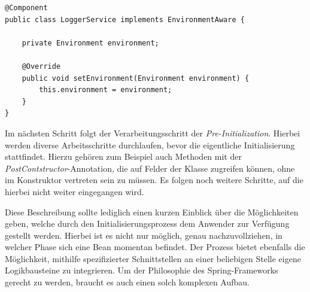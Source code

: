 \begin{lstlisting}[style=javaStyle,caption={Bean - EnvironmentAware \cite{bean-aware}},label=lst:bean-aware]
@Component
public class LoggerService implements EnvironmentAware {

	private Environment environment;

	@Override
	public void setEnvironment(Environment environment) {
		this.environment = environment;
	}
}
\end{lstlisting}
Im nächsten Schritt folgt der Verarbeitungsschritt der \emph{Pre-Initialization}. Hierbei werden diverse Arbeitsschritte durchlaufen, bevor die eigentliche Initialisierung stattfindet. Hierzu gehören zum Beispiel auch Methoden mit der \emph{PostContstructor}-Annotation, die auf Felder der Klasse zugreifen können, ohne im Konstruktor vertreten sein zu müssen. Es folgen noch weitere Schritte, auf die hierbei nicht weiter eingegangen wird. 

Diese Beschreibung sollte lediglich einen kurzen Einblick über die Möglichkeiten geben, welche durch den Initialisierungsprozess dem Anwender zur Verfügung gestellt werden. Hierbei ist es nicht nur möglich, genau nachzuvollziehen, in welcher Phase sich eine Bean momentan befindet. Der Prozess bietet ebenfalls die Möglichkeit, mithilfe spezifizierter Schnittstellen an einer beliebigen Stelle eigene Logikbausteine zu integrieren. Um der Philosophie des Spring-Frameworks gerecht zu werden, braucht es auch einen solch komplexen Aufbau. 


